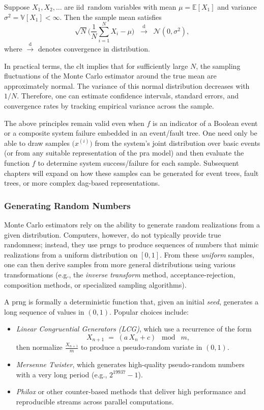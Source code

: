 \begin{theorem}
\label{thm:CLT}
Suppose \(X_1, X_2,\dots\) are \acrshort{iid}\ random variables with mean \(\mu=\mathbb{E}[X_1]\) and variance \(\sigma^2=\mathbb{V}[X_1]<\infty\). Then the sample mean satisfies
\[
\sqrt{N}
\biggl(
 \frac{1}{N}\sum_{i=1}^N X_i - \mu
\biggr)
\;\;\xrightarrow{\mathrm{d}}\;\;
\mathcal{N}(0,\sigma^2),
\]
where \(\xrightarrow{\mathrm{d}}\) denotes convergence in distribution.
\end{theorem}

In practical terms, the \acrfull{clt} implies that for sufficiently large \(N\), the sampling fluctuations of the Monte Carlo estimator around the true mean are approximately normal. The variance of this normal distribution decreases with \(1/N\). Therefore, one can estimate confidence intervals, standard errors, and convergence rates by tracking empirical variance across the sample.

The above principles remain valid even when \(f\) is an indicator of a Boolean event or a composite system failure embedded in an event/fault tree. One need only be able to draw samples \(\bigl(x^{(i)}\bigr)\) from the system’s joint distribution over basic events (or from any suitable representation of the \acrshort{pra} model) and then evaluate the function \(f\) to determine system success/failure for each sample. Subsequent chapters will expand on how these samples can be generated for event trees, fault trees, or more complex \acrshort{dag}-based representations.

\subsubsection{Generating Random Numbers}
Monte Carlo estimators rely on the ability to generate random realizations from a given distribution. Computers, however, do not typically provide true randomness; instead, they use \acrfull{prng}s to produce sequences of numbers that mimic realizations from a uniform distribution on \([0,1]\). From these \emph{uniform} samples, one can then derive samples from more general distributions using various transformations (e.g., the \emph{inverse transform} method, acceptance-rejection, composition methods, or specialized sampling algorithms).

A \acrshort{prng} is formally a deterministic function that, given an initial \emph{seed}, generates a long sequence of values in \((0,1)\). Popular choices include:
\begin{itemize}
\item \emph{Linear Congruential Generators (LCG)}, which use a recurrence of the form
\[
X_{n+1}
\;=\;
(a\,X_n + c)
\;\bmod\; m,
\]
then normalize \(\frac{X_{n+1}}{m}\) to produce a pseudo-random variate in \((0,1)\).
\item \emph{Mersenne Twister}, which generates high-quality pseudo-random numbers with a very long period (e.g., \(2^{19937}-1\)).
\item \emph{Philox} or other counter-based methods that deliver high performance and reproducible streams across parallel computations.
\end{itemize}

